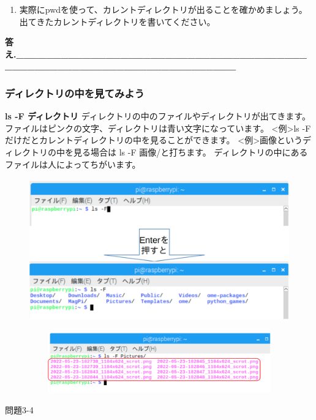 \documentclass[a4paper,dvipdfmx]{jarticle}
\begin{document}
\begin{enumerate}
\item
実際にpwdを使って、カレントディレクトリが出ることを確かめましょう。\newline
出てきたカレントディレクトリを書いてください。
\end{enumerate}

\bigskip

{\ttfamily\bfseries
答え.\_\_\_\_\_\_\_\_\_\_\_\_\_\_\_\_\_\_\_\_\_\_\_\_\_\_\_\_\_\_\_\_\_\_\_\_\_\_\_\_\_\_\_\_\_\_\_\_\_\_\_\_\_\_\_\_\_\_\_\_\_\_\_\_\_\_\_\_\_\_}

\subsubsection{}
\clearpage\subsubsection{ディレクトリの中を見てみよう}
\textbf{ls {}-F ディレクトリ}\newline
ディレクトリの中のファイルやディレクトリが出てきます。ファイルはピンクの文字、ディレクトリは青い文字になっています。\newline
{\textless}例{\textgreater}ls
{}-Fだけだとカレントディレクトリの中を見ることができます。\newline
{\textless}例{\textgreater}画像というディレクトリの中を見る場合は
ls {}-F 画像/と打ちます。\newline
ディレクトリの中にあるファイルは人によってちがいます。\newline


\begin{figure}
\centering
\includegraphics[width=17.006cm,height=6.14cm]{text03-img/text03-img008.png}
\end{figure}
\begin{figure}
\centering
\includegraphics[width=15.122cm,height=2.607cm]{text03-img/text03-img009.png}
\end{figure}
{\ttfamily
問題3-4}
\end{document}

